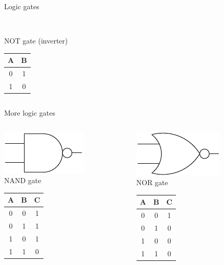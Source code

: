 \begin{frame}{Logic gates}
\begin{columns}
\begin{column}{3cm}
\begin{center}
        \\NOT gate (inverter)
        \begin{tabular}{c|c}
          \textbf{A} & \textbf{B} \\
          \hline
          0 & 1 \\
          1 & 0 \\
        \end{tabular}
      \end{center}
    \end{column}
  \end{columns}
\end{frame}

\begin{frame}{More logic gates}
  \begin{columns}
    \begin{column}{3cm}
      \begin{center}
        \includegraphics{NANDGate}
        \\NAND gate
        \begin{tabular}{cc|c}
          \textbf{A} & \textbf{B} & \textbf{C} \\
          \hline
          0 & 0 & 1 \\
          0 & 1 & 1 \\
          1 & 0 & 1 \\
          1 & 1 & 0 \\
        \end{tabular}
      \end{center}
    \end{column}
    \begin{column}{3cm}
      \begin{center}
        \includegraphics{NORGate}
        \\NOR gate
        \begin{tabular}{cc|c}
          \textbf{A} & \textbf{B} & \textbf{C} \\
          \hline
          0 & 0 & 1 \\
          0 & 1 & 0 \\
          1 & 0 & 0 \\
          1 & 1 & 0 \\
        \end{tabular}
      \end{center}
    \end{column}
  \end{columns}
\end{frame}

